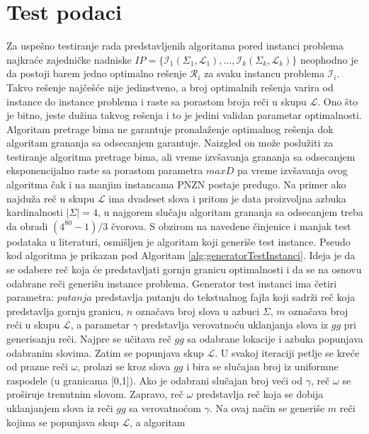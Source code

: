 \documentclass[12pt,oneside]{memoir}
\begin{document}
\section{Test podaci}
\label{sec:testPodaci}
Za uspešno testiranje rada predstavljenih algoritama pored instanci problema najkraće
zajedničke nadniske
$IP = \{\mathcal{I}_{1}(\Sigma_{1},\mathcal{L}_{1}),...,\mathcal{I}_{k}(\Sigma_{k},\mathcal{L}_{k})\}$
neophodno je da postoji barem jedno optimalno rešenje $\mathcal{R}_{i}$ za svaku
instancu problema $\mathcal{I}_{i}$. Takvo rešenje najčešće nije jedinstveno,
a broj optimalnih rešenja varira od instance do instance problema i raste sa porastom
broja reči u skupu $\mathcal{L}$. Ono što je bitno, jeste dužina takvog rešenja i to je
jedini validan parametar optimalnosti. Algoritam pretrage bima ne garantuje pronalaženje
optimalnog rešenja dok algoritam grananja sa odsecanjem garantuje. Naizgled on može poslužiti
za testiranje algoritma pretrage bima, ali
vreme izvšavanja grananja sa odsecanjem eksponencijalno raste sa porastom parametra $maxD$
pa vreme izvšavanja ovog algoritma čak i na manjim instancama PNZN postaje predugo.
Na primer ako najduža reč u skupu $\mathcal{L}$ ima dvadeset slova i pritom je
data proizvoljna azbuka kardinalnosti $|\Sigma|=4$, u najgorem slučaju
algoritam grananja sa odsecanjem treba da obradi $(4^{80}-1)/3$ čvorova.
S obzirom na navedene činjenice i manjak test podataka u literaturi, osmišljen je
algoritam koji generiše test instance. Pseudo kod algoritma je prikazan pod
Algoritam \ref{alg:generatorTestInstanci}. Ideja je da se odabere reč koja će 
predstavljati gornju granicu optimalnosti i da se na osnovu odabrane reči
generišu instance problema.
Generator test instanci ima četiri parametra: $putanja$ predstavlja putanju do
tekstualnog fajla koji sadrži reč koja predstavlja gornju granicu, $n$ označava
broj slova u azbuci $\Sigma$, $m$ označava broj reči u skupu $\mathcal{L}$,
a parametar $\gamma$ predstavlja verovatnoću uklanjanja slova iz $gg$ pri generisanju
reči. Najpre se učitava reč $gg$ sa odabrane lokacije i azbuka popunjava
odabranim slovima. Zatim se popunjava skup $\mathcal{L}$.
U svakoj iteraciji petlje se kreće od prazne reči $\omega$, prolazi se
kroz slova $gg$ i bira se slučajan broj iz uniformne raspodele (u granicama [0,1]).
Ako je odabrani slučajan broj veći od $\gamma$, reč $\omega$ se proširuje
trenutnim slovom. Zapravo, reč $\omega$ predstavlja reč koja se dobija uklanjanjem slova iz 
reči $gg$ sa verovatnoćom $\gamma$.
Na ovaj način se generiše $m$ reči kojima se popunjava skup $\mathcal{L}$, a algoritam
\end{document}
